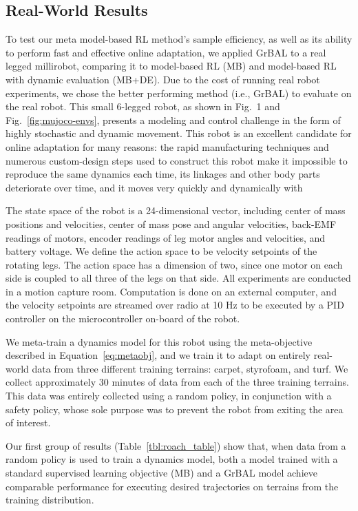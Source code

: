 \vspsubsec
\subsection{Real-World Results}
\vspsubsec
To test our meta model-based RL method's sample efficiency, as well as its ability to perform fast and effective online adaptation, we applied GrBAL to a real legged millirobot, comparing it to model-based RL (MB) and model-based RL with dynamic evaluation (MB+DE). Due to the cost of running real robot experiments, we chose the better performing method (i.e., GrBAL) to evaluate on the real robot.
This small 6-legged robot, as shown in Fig.~1 and Fig.~\ref{fig:mujoco-envs}, presents a modeling and control challenge in the form of highly stochastic and dynamic movement. This robot is an excellent candidate for online adaptation for many reasons: the rapid manufacturing techniques and numerous custom-design steps used to construct this robot make it impossible to reproduce the same dynamics each time, its linkages and other body parts deteriorate over time, and it moves very quickly and dynamically with 

The state space of the robot is a 24-dimensional vector, including center of mass positions and velocities, center of mass pose and angular velocities, back-EMF readings of motors, encoder readings of leg motor angles and velocities, and battery voltage. We define the action space to be velocity setpoints of the rotating legs. The action space has a dimension of two, since one motor on each side is coupled to all three of the legs on that side. All experiments are conducted in a motion capture room. Computation is done on an external computer, and the velocity setpoints are streamed over radio at 10 Hz to be executed by a PID controller on the microcontroller on-board of the robot.

We meta-train a dynamics model for this robot using the meta-objective described in Equation~\ref{eq:metaobj}, and we train it to adapt on entirely real-world data from three different training terrains: carpet, styrofoam, and turf. We collect approximately 30 minutes of data from each of the three training terrains. This data was entirely collected using a random policy, in conjunction with a safety policy, whose sole purpose was to prevent the robot from exiting the area of interest.

Our first group of results (Table~\ref{tbl:roach_table}) show that, when data from a random policy is used to train a dynamics model, both a model trained with a standard supervised learning objective (MB) and a GrBAL model achieve comparable performance for executing desired trajectories on terrains from the training distribution.

